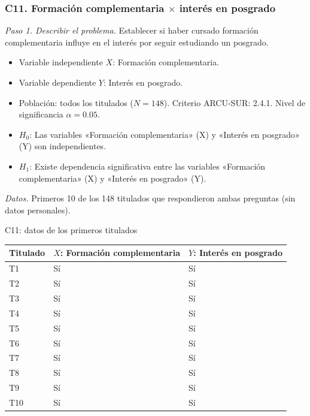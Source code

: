 \subsubsection*{C11. Formación complementaria $\times$ interés en posgrado}

\textit{Paso 1. Describir el problema.} Establecer si haber cursado formación complementaria influye en el interés por seguir estudiando un posgrado.

\begin{itemize}[nosep]
  \item Variable independiente $X$: Formación complementaria.
  \item Variable dependiente $Y$: Interés en posgrado.
  \item Población: todos los titulados ($N = 148$). Criterio ARCU-SUR: 2.4.1. Nivel de significancia $\alpha = 0.05$.
  \item $H_0$: Las variables «Formación complementaria» (X) y «Interés en posgrado» (Y) son independientes.
  \item $H_1$: Existe dependencia significativa entre las variables «Formación complementaria» (X) y «Interés en posgrado» (Y).
\end{itemize}

\textit{Datos.} Primeros 10 de los 148 titulados que respondieron ambas preguntas (sin datos personales).

\begin{mitabla}{C11: datos de los primeros titulados}
\begin{tabular}{lll}
\toprule
Titulado & $X$: Formación complementaria & $Y$: Interés en posgrado \\
\midrule
T1 & Sí & Sí \\
T2 & Sí & Sí \\
T3 & Sí & Sí \\
T4 & Sí & Sí \\
T5 & Sí & Sí \\
T6 & Sí & Sí \\
T7 & Sí & Sí \\
T8 & Sí & Sí \\
T9 & Sí & Sí \\
T10 & Sí & Sí \\
\bottomrule
\end{tabular}
\end{mitabla}

